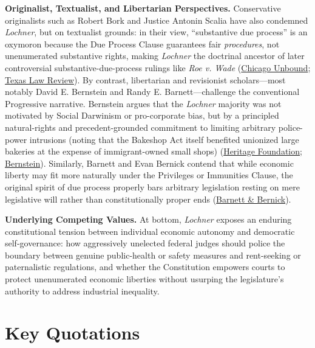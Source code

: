 \documentclass[12pt]{article}
\begin{document}
\textbf{Originalist, Textualist, and Libertarian Perspectives.} Conservative originalists such as Robert Bork and Justice Antonin Scalia have also condemned \textit{Lochner}, but on textualist grounds: in their view, ``substantive due process'' is an oxymoron because the Due Process Clause guarantees fair \textit{procedures}, not unenumerated substantive rights, making \textit{Lochner} the doctrinal ancestor of later controversial substantive-due-process rulings like \textit{Roe v. Wade} (\href{https://chicagounbound.uchicago.edu/cgi/viewcontent.cgi?article=1022&context=uclrev_online}{Chicago Unbound}; \href{https://texaslawreview.org/in-defense-of-substantive-due-process/}{Texas Law Review}). By contrast, libertarian and revisionist scholars---most notably David E. Bernstein and Randy E. Barnett---challenge the conventional Progressive narrative. Bernstein argues that the \textit{Lochner} majority was not motivated by Social Darwinism or pro-corporate bias, but by a principled natural-rights and precedent-grounded commitment to limiting arbitrary police-power intrusions (noting that the Bakeshop Act itself benefited unionized large bakeries at the expense of immigrant-owned small shops) (\href{https://www.heritage.org/the-constitution/report/economic-liberty-and-the-constitution-introduction}{Heritage Foundation}; \href{https://www.researchgate.net/publication/228158799_Lochner_v_New_York_A_Centennial_Retrospective}{Bernstein}). Similarly, Barnett and Evan Bernick contend that while economic liberty may fit more naturally under the Privileges or Immunities Clause, the original spirit of due process properly bars arbitrary legislation resting on mere legislative will rather than constitutionally proper ends (\href{https://wmlawreview.org/sites/default/files/Barnett\%20\%26\%20Bernick.pdf}{Barnett \& Bernick}).

\textbf{Underlying Competing Values.} At bottom, \textit{Lochner} exposes an enduring constitutional tension between individual economic autonomy and democratic self-governance: how aggressively unelected federal judges should police the boundary between genuine public-health or safety measures and rent-seeking or paternalistic regulations, and whether the Constitution empowers courts to protect unenumerated economic liberties without usurping the legislature's authority to address industrial inequality.

\section{Key Quotations}
\end{document}
